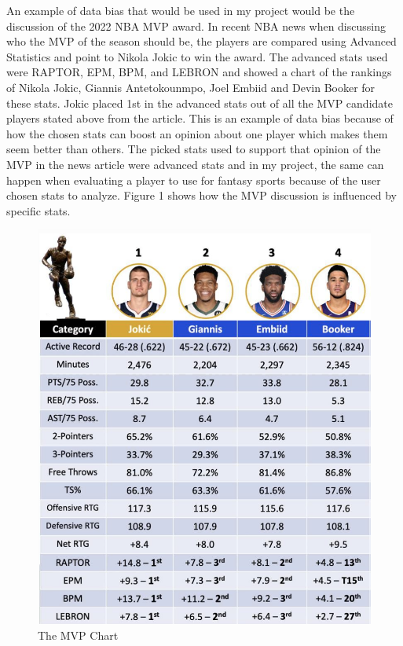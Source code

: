 \documentclass[10pt,twocolumn]{article}
\begin{document}
An example of data bias that would be used in my project would be the discussion of the 2022 NBA MVP award. In recent NBA news when discussing who the MVP of the season should be, the players are compared using Advanced Statistics and point to Nikola Jokic to win the award. The advanced stats used were RAPTOR, EPM, BPM, and LEBRON and showed a chart of the rankings of Nikola Jokic, Giannis Antetokounmpo, Joel Embiid and Devin Booker for these stats. Jokic placed 1st in the advanced stats out of all the MVP candidate players stated above from the article. This is an example of data bias because of how the chosen stats can boost an opinion about one player which makes them seem better than others. The picked stats used to support that opinion of the MVP in the news article were advanced stats and in my project, the same can happen when evaluating a player to use for fantasy sports because of the user chosen stats to analyze. Figure 1 shows how the MVP discussion is influenced by specific stats. 

\begin{figure}
    \centering
    \includegraphics[width=.95\linewidth]{mvp.png}
    \caption{
        The MVP Chart
    }
    \label{fig:first-page}
\end{figure}
\end{document}
